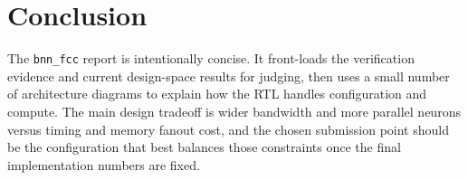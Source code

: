 \section{Conclusion}

The \texttt{bnn\_fcc} report is intentionally concise. It front-loads the
verification evidence and current design-space results for judging, then uses a
small number of architecture diagrams to explain how the RTL handles
configuration and compute. The main design tradeoff is wider bandwidth and more
parallel neurons versus timing and memory fanout cost, and the chosen
submission point should be the configuration that best balances those
constraints once the final implementation numbers are fixed.
